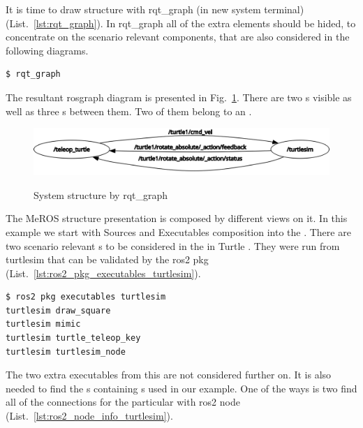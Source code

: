 \documentclass[11pt,oneside,a4paper]{report}
\begin{document}
It is time to draw \stSystem{} structure with \textsf{rqt\_graph} \stCLTool{} (in new system terminal)  (List.~\ref{lst:rqt_graph}). In rqt\_graph all of the extra elements should be hided, to concentrate on the scenario relevant \stSystem{} components, that are also considered in the following diagrams.

\begin{lstlisting}[style=terminal,label={lst:rqt_graph},caption={rqt\_graph}]
$ rqt_graph
\end{lstlisting}

The resultant rosgraph diagram is presented in Fig.~\ref{fig:rqt_graph}. There are two \stNode{}s visible as well as three \stTopic{}s between them. Two of them belong to an \stAction{}.

\begin{figure}[H]
	\centering
	\begin{center}
		{\includegraphics[scale=.5]{diagrams/rosgraph.png}}
	\end{center}
	\caption{System structure by rqt\_graph}
	\label{fig:rqt_graph}
\end{figure}


The MeROS \stSystem{} structure presentation is composed by different views on it. In this example we start with Sources and Executables composition into the \stSystem{}. There are two scenario relevant \stNode{}s to be considered in the in \textsf{Turtle} \stSystem{}. They were run from \textsf{turtlesim} \stPackage{} that can be validated by the \textsf{ros2 pkg} \stCLTool{} (List.~\ref{lst:ros2_pkg_executables_turtlesim}).

\begin{lstlisting}[style=terminal,label={lst:ros2_pkg_executables_turtlesim},caption={ros2 pkg executables turtlesim}]
$ ros2 pkg executables turtlesim
turtlesim draw_square
turtlesim mimic
turtlesim turtle_teleop_key
turtlesim turtlesim_node
\end{lstlisting}

The two extra executables from this \stPackage{} are not considered further on. It is also needed to find the \stPackage{}s containing \stRosConnection{}s used in our example. One of the ways is two find all of the connections for the particular \stNode{} with \textsf{ros2 node} \stCLTool{} (List.~\ref{lst:ros2_node_info_turtlesim}).
\end{document}

